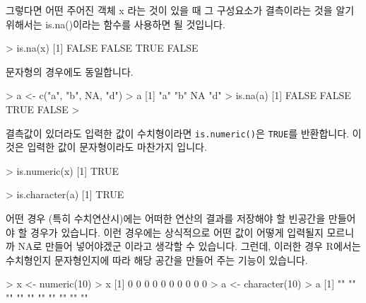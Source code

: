 \documentclass[tutorial.tex]{subfiles}
\begin{document}
그렇다면 어떤 주어진 객체 x 라는 것이 있을 때 그 구성요소가 결측이라는 것을 알기 위해서는 is.na()이라는 함수를 사용하면 될 것입니다. 

\begin{Schunk}
\begin{Soutput}
> is.na(x)
[1] FALSE FALSE  TRUE FALSE
\end{Soutput}
\end{Schunk}

문자형의 경우에도 동일합니다. 

\begin{Schunk}
\begin{Soutput}
> a <- c("a", "b", NA, "d")
> a
[1] "a" "b" NA  "d"
> is.na(a)
[1] FALSE FALSE  TRUE FALSE
> 
\end{Soutput}
\end{Schunk}

결측값이 있더라도 입력한 값이 수치형이라면 \texttt{is.numeric()}은 \texttt{TRUE}를 반환합니다. 
이것은 입력한 값이 문자형이라도 마찬가지 입니다.

\begin{Schunk}
\begin{Soutput}
> is.numeric(x)
[1] TRUE

> is.character(a)
[1] TRUE
\end{Soutput}
\end{Schunk}

어떤 경우 (특히 수치연산시)에는 어떠한 연산의 결과를 저장해야 할 빈공간을 만들어야 할 경우가 있습니다.
이런 경우에는 상식적으로 어떤 값이 어떻게 입력될지 모르니까 NA로 만들어 넣어야겠군 이라고 생각할 수 있습니다. 
그런데, 이러한 경우 R에서는 수치형인지 문자형인지에 따라 해당 공간을 만들어 주는 기능이 있습니다. 

\begin{Schunk}
\begin{Soutput}
> x <- numeric(10)
> x
 [1] 0 0 0 0 0 0 0 0 0 0
> a <- character(10)
> a
 [1] "" "" "" "" "" "" "" "" "" ""
\end{Soutput}
\end{Schunk}
\end{document}
